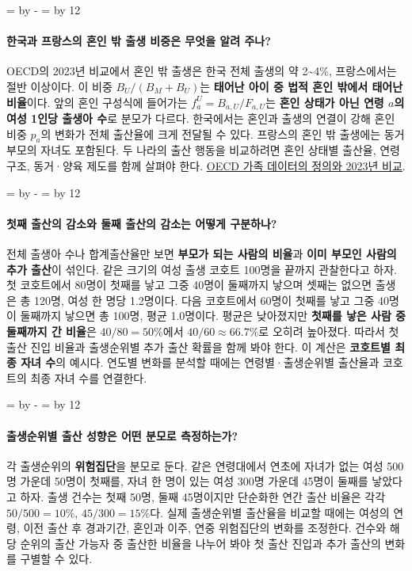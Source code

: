 \documentclass[10pt,a4paper]{article}
\newcommand{\ReserveQuestionSpace}{%
  \par\begingroup
  \dimen0=\pagegoal \advance\dimen0 by -\pagetotal
  \dimen2=\baselineskip \multiply\dimen2 by 12
  \ifdim\dimen0<\dimen2 \newpage\fi
  \endgroup}
\begin{document}
\ReserveQuestionSpace
\paragraph{한국과 프랑스의 혼인 밖 출생 비중은 무엇을 알려 주나?}
OECD의 2023년 비교에서 혼인 밖 출생은 한국 전체 출생의 약 2\textasciitilde{}4\%, 프랑스에서는 절반 이상이다. 이 비중 $B_U/(B_M+B_U)$는 \textbf{태어난 아이 중 법적 혼인 밖에서 태어난 비율}이다. 앞의 혼인 구성식에 들어가는 $f_a^U=B_{a,U}/F_{a,U}$는 \textbf{혼인 상태가 아닌 연령 $a$의 여성 1인당 출생아 수}로 분모가 다르다. 한국에서는 혼인과 출생의 연결이 강해 혼인 비중 $p_a$의 변화가 전체 출산율에 크게 전달될 수 있다. 프랑스의 혼인 밖 출생에는 동거 부모의 자녀도 포함된다. 두 나라의 출산 행동을 비교하려면 혼인 상태별 출산율, 연령 구조, 동거·양육 제도를 함께 살펴야 한다. \href{https://webfs.oecd.org/els-com/Family\_Database/SF\_2\_4\_Share\_births\_outside\_marriage.pdf}{OECD 가족 데이터의 정의와 2023년 비교}.\par

\ReserveQuestionSpace
\paragraph{첫째 출산의 감소와 둘째 출산의 감소는 어떻게 구분하나?}
전체 출생아 수나 합계출산율만 보면 \textbf{부모가 되는 사람의 비율}과 \textbf{이미 부모인 사람의 추가 출산}이 섞인다. 같은 크기의 여성 출생 코호트 100명을 끝까지 관찰한다고 하자. 첫 코호트에서 80명이 첫째를 낳고 그중 40명이 둘째까지 낳으며 셋째는 없으면 출생은 총 120명, 여성 한 명당 1.2명이다. 다음 코호트에서 60명이 첫째를 낳고 그중 40명이 둘째까지 낳으면 총 100명, 평균 1.0명이다. 평균은 낮아졌지만 \textbf{첫째를 낳은 사람 중 둘째까지 간 비율}은 $40/80=50\%$에서 $40/60\approx66.7\%$로 오히려 높아졌다. 따라서 첫 출산 진입 비율과 출생순위별 추가 출산 확률을 함께 봐야 한다. 이 계산은 \textbf{코호트별 최종 자녀 수}의 예시다. 연도별 변화를 분석할 때에는 연령별·출생순위별 출산율과 코호트의 최종 자녀 수를 연결한다.\par

\ReserveQuestionSpace
\paragraph{출생순위별 출산 성향은 어떤 분모로 측정하는가?}
각 출생순위의 \textbf{위험집단}을 분모로 둔다. 같은 연령대에서 연초에 자녀가 없는 여성 500명 가운데 50명이 첫째를, 자녀 한 명이 있는 여성 300명 가운데 45명이 둘째를 낳았다고 하자. 출생 건수는 첫째 50명, 둘째 45명이지만 단순화한 연간 출산 비율은 각각 $50/500=10\%$, $45/300=15\%$다. 실제 출생순위별 출산율을 비교할 때에는 여성의 연령, 이전 출산 후 경과기간, 혼인과 이주, 연중 위험집단의 변화를 조정한다. 건수와 해당 순위의 출산 가능자 중 출산한 비율을 나누어 봐야 첫 출산 진입과 추가 출산의 변화를 구별할 수 있다.\par
\end{document}
